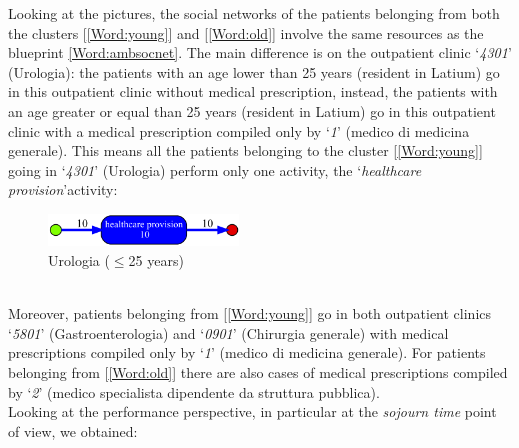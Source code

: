 Looking at the pictures, the social networks of the patients belonging from both the clusters [\ref{Word:young}] and [\ref{Word:old}] involve the same resources as the blueprint \ref{Word:ambsocnet}. The main difference is on the outpatient clinic `\textit{4301}' (Urologia): the patients with an age lower than 25 years (resident in Latium) go in this outpatient clinic without medical prescription, instead, the patients with an age greater or equal than 25 years (resident in Latium) go in this outpatient clinic with a medical prescription compiled only by `\textit{1}' (medico di medicina generale). This means all the patients belonging to the cluster [\ref{Word:young}] going in `\textit{4301}' (Urologia) perform only one activity, the `\textit{healthcare provision}'activity:
\begin{figure} [htbp]
\includegraphics[width=0.45\textwidth]{AmbulatoriInductiveVisualMinerYoungs4301}
\caption{Urologia ($\leq$25 years)}
\end{figure}\\
Moreover, patients belonging from [\ref{Word:young}] go in both outpatient clinics `\textit{5801}' (Gastroenterologia) and `\textit{0901}' (Chirurgia generale) with medical prescriptions compiled only by `\textit{1}' (medico di medicina generale). For patients belonging from [\ref{Word:old}] there are also cases of medical prescriptions compiled by `\textit{2}' (medico specialista dipendente da struttura pubblica).\\
Looking at the performance perspective, in particular at the \textit{sojourn time} point of view, we obtained:
